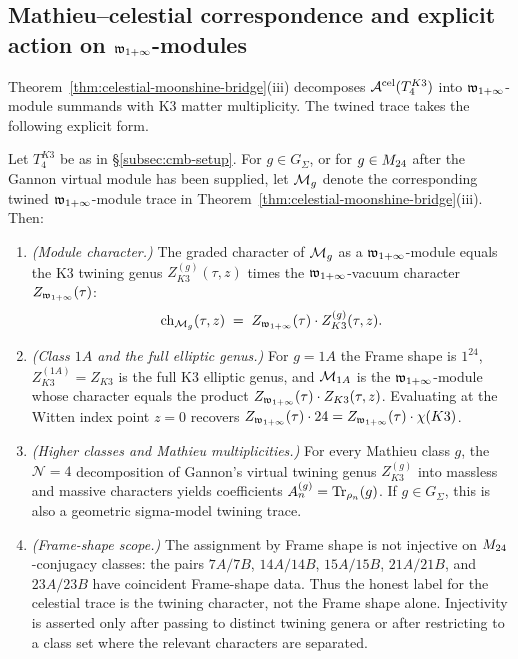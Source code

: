 \subsection{Mathieu--celestial correspondence and explicit action on $\mathfrak w_{1+\infty}$-modules}
\label{subsec:cmb-twining}

Theorem~\ref{thm:celestial-moonshine-bridge}(iii) decomposes
$\mathcal A^{\mathrm{cel}}(T_4^{K3})$ into $\mathfrak w_{1+\infty}$-module summands with K3 matter
multiplicity. The twined trace takes the following explicit form.

\begin{theorem}
\label{thm:mathieu-celestial-correspondence}
Let $T_4^{K3}$ be as in \S\ref{subsec:cmb-setup}. For \(g\in G_\Sigma\),
or for \(g\in M_{24}\) after the Gannon virtual module has been
supplied, let $\mathcal M_g$ denote the corresponding twined $\mathfrak w_{1+\infty}$-module
trace in Theorem~\ref{thm:celestial-moonshine-bridge}(iii).
Then:
\begin{enumerate}[label=\textup{(\roman*)}]
\item \emph{(Module character.)}
The graded character of $\mathcal M_g$ as a $\mathfrak w_{1+\infty}$-module equals the
K3 twining genus $Z_{K3}^{(g)}(\tau, z)$ times the $\mathfrak w_{1+\infty}$-vacuum
character $Z_{\mathfrak w_{1+\infty}}(\tau)$:
\[
\mathrm{ch}_{\mathcal M_g}(\tau, z)
\;=\;
Z_{\mathfrak w_{1+\infty}}(\tau) \cdot Z_{K3}^{(g)}(\tau, z).
\]
\item \emph{(Class $1A$ and the full elliptic genus.)}
For $g = 1A$ the Frame shape is $1^{24}$, $Z_{K3}^{(1A)} = Z_{K3}$ is
the full K3 elliptic genus, and $\mathcal M_{1A}$ is the $\mathfrak w_{1+\infty}$-module whose
character equals the product $Z_{\mathfrak w_{1+\infty}}(\tau) \cdot Z_{K3}(\tau, z)$.
Evaluating at the Witten index point $z = 0$ recovers
$Z_{\mathfrak w_{1+\infty}}(\tau) \cdot 24 = Z_{\mathfrak w_{1+\infty}}(\tau) \cdot \chi(K3)$.
\item \emph{(Higher classes and Mathieu multiplicities.)}
For every Mathieu class \(g\), the $\mathcal{N}{=}4$ decomposition of
Gannon's virtual twining genus \(Z_{K3}^{(g)}\) into massless and massive
characters yields coefficients \(A_n^{(g)}=\operatorname{Tr}_{\rho_n}(g)\). If
\(g\in G_\Sigma\), this is also a geometric sigma-model twining trace.
\item \emph{(Frame-shape scope.)}
The assignment by Frame shape is not injective on \(M_{24}\)-conjugacy
classes: the pairs \(7A/7B\), \(14A/14B\), \(15A/15B\), \(21A/21B\),
and \(23A/23B\) have coincident Frame-shape data. Thus the honest label
for the celestial trace is the twining character, not the Frame shape
alone. Injectivity is asserted only after passing to distinct twining
genera or after restricting to a class set where the relevant characters
are separated.
\end{enumerate}
\end{theorem}


